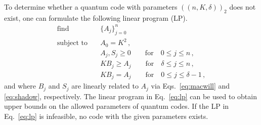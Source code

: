 \documentclass[12pt,a4paper]{amsart}
\newcommand{\nn}{\nonumber}
\begin{document}
To determine whether a quantum code with parameters $(\!(n,K,\delta)\!)_2$ does not exist, one can formulate the following linear program (LP).
% 
\begin{align}\label{eq:lp}
		\text{find} 	\quad & \{A_j\}^{n}_{j=0} \nn\\
		\text{subject to}	\quad & A_0=K^2\,, \nn\\
		& A_j, S_j \geq 0 \quad\quad \text{for} \quad 0\leq j\leq n \,, \nn \\
        &  KB_j \geq A_j  \quad\quad \text{for}\quad \delta \leq j\leq n \,, \nn\\
        & KB_j = A_j  \quad\quad \text{for}\quad 0 \leq j\leq \delta-1 \,,
\end{align}
and where $B_j$ and $S_j$ are linearly related to $A_j$ via Eqs.~\eqref{eq:macwill} and \eqref{eq:shadow}, respectively.
The linear program in Eq.~\eqref{eq:lp} can be used to obtain upper bounds on the allowed parameters of quantum codes.
If the LP in Eq.~\eqref{eq:lp} is infeasible, 
no code with the given parameters exists.
\end{document}

